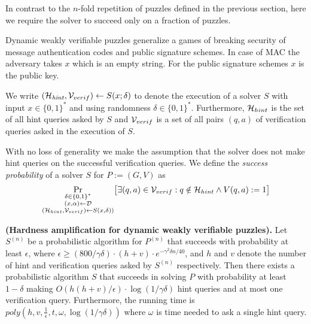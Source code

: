 In contrast to the $n$-fold repetition of puzzles defined in the previous section, here we
require the solver to succeed only on a fraction of puzzles.

Dynamic weakly verifiable puzzles generalize a games of breaking security of message authentication codes and public signature schemes.
In case of MAC the adversary takes $x$ which is an empty string. For the public signature schemes $x$ is the public key.

We write $(\mathcal{H}_{\mathit{hint}}, \mathcal{V}_{verif}) \leftarrow S(x; \delta)$
to denote the execution of a solver $S$ with input $x \in \{0,1\}^{*}$ and using randomness $\delta \in \{0,1\}^{*}$.
Furthermore, $\mathcal{H}_{hint}$ is the set of all hint queries asked by $S$ and $\mathcal{V}_{verif}$ is
a set of all pairs $(q,a)$ of verification queries asked in the execution of $S$.

With no loss of generality we make the assumption that the solver does not make
hint queries on the successful verification queries.
We define the \textit{success probability} of a solver $S$ for $P := (G,V)$ as
\begin{align*}
  \underset{\substack{\delta \in \{0,1\}^{*} \\(x,\alpha) \leftarrow \mathcal{D} \\ (\mathcal{H}_{hint}, \mathcal{V}_{verif}) \leftarrow S(x,\delta))}}
  {\Pr}\big[\exists (q,a) \in \mathcal{V}_{verif} : q \notin \mathcal{H}_{hint} \land V(q,a) := 1 \big]
\end{align*}

\begin{theorem}\textbf{(Hardness amplification for dynamic weakly verifiable puzzles).}
\label{lemma:dwvp}
Let $S^{(n)}$ be a probabilistic algorithm for $P^{(n)}$ that succeeds with
probability at least $\epsilon$, where $\epsilon \geq (800/\gamma\delta) \cdot (h+v) \cdot e^{-\gamma^2\delta n/40}$, and $h$ and $v$
denote the number of hint and verification queries asked by $S^{(n)}$ respectively.
Then there exists a probabilistic algorithm $S$ that succeeds in solving $P$ with probability at least
$1-\delta$ making $O(h(h+v)/\epsilon) \cdot \log(1/\gamma\delta)$ hint queries and at most one verification query.
Furthermore, the running time is $\mathit{poly}(h,v,\frac{1}{\epsilon}, t, \omega, \log(1/\gamma\delta))$ where
$\omega$ is time needed to ask a single hint query.
\end{theorem}

